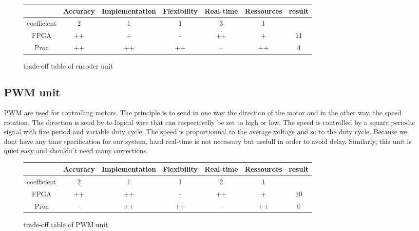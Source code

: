 \begin{figure}[!ht]
\hspace{-1cm}
\begin{tabular}{|c|c|c|c|c|c|c|}\hline
                         & Accuracy  & Implementation & Flexibility & Real-time & Ressources & result \\\hline
coefficient   &         2          &           1                      &         1           &           3         &           1            &              \\\hline
FPGA            &      ++          &            +                    &         -           &        ++         &           +           &    11        \\\hline
Proc               &      ++         &              ++                &         ++       &         --          &           ++        &   4 \\\hline
\end{tabular}
\caption{trade-off table of encoder unit}
\end{figure}

\subsection{PWM unit}

PWM are used for controlling motors. The principle is to send in one way the direction of the motor and in the other way, the speed rotation. The direction is send by to logical wire that can respectivelly be set to high or low. The speed is controlled by a square periodic signal with fixe period and variable duty cycle. The speed is proportionnal to the average voltage and so to the duty cycle. Because we dont have any time specification for our system, hard real-time is not necessary but usefull in order to avoid delay. Similarly, this unit is quiet easy and shouldn't need many corrections. 

\begin{figure}[!ht]
\hspace{-1cm}
\begin{tabular}{|c|c|c|c|c|c|c|}\hline
                         & Accuracy  & Implementation & Flexibility & Real-time & Ressources & result \\\hline
coefficient   &         2          &           1                      &         1           &           2         &         1               &             \\\hline
FPGA            &      ++          &            ++                 &         -           &        ++         &         +              &   10     \\\hline
Proc               &      -             &              ++               &         ++       &         --          &          ++          &       0    \\\hline
\end{tabular}
\caption{trade-off table of PWM unit}
\end{figure}

